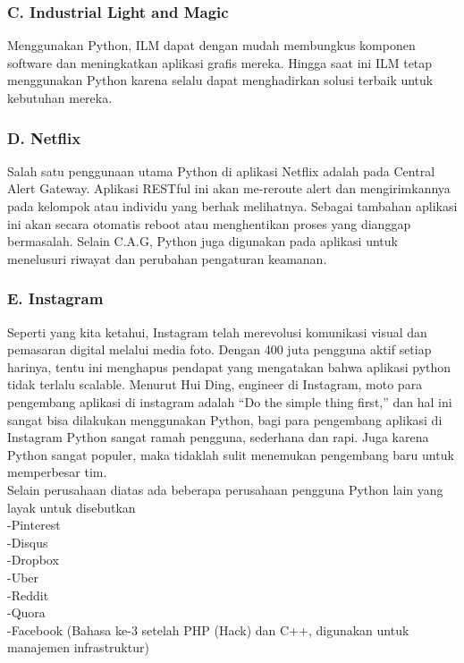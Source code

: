 \documentclass[12pt, times new roman, a4paper]{article}
\begin{document}
\subsubsection*{C. Industrial Light and Magic}
Menggunakan Python, ILM dapat dengan mudah membungkus komponen software dan meningkatkan aplikasi grafis mereka. Hingga saat ini ILM tetap menggunakan Python karena selalu dapat menghadirkan solusi terbaik untuk kebutuhan mereka.

\subsubsection*{D. Netflix}
Salah satu penggunaan utama Python di aplikasi Netflix adalah pada Central Alert Gateway. Aplikasi RESTful ini akan me-reroute alert dan mengirimkannya pada kelompok atau individu yang berhak melihatnya. Sebagai tambahan aplikasi ini akan secara otomatis reboot atau menghentikan proses yang dianggap bermasalah. Selain C.A.G, Python juga digunakan pada aplikasi untuk menelusuri riwayat dan perubahan pengaturan keamanan.

\subsubsection*{E. Instagram}
Seperti yang kita ketahui, Instagram telah merevolusi komunikasi visual dan pemasaran digital melalui media foto. Dengan 400 juta pengguna aktif setiap harinya, tentu ini menghapus pendapat yang mengatakan bahwa aplikasi python tidak terlalu scalable. Menurut Hui Ding, engineer di Instagram, moto para pengembang aplikasi di instagram adalah “Do the simple thing first,” dan hal ini sangat bisa dilakukan menggunakan Python, bagi para pengembang aplikasi di Instagram Python sangat ramah pengguna, sederhana dan rapi. Juga karena Python sangat populer, maka tidaklah sulit menemukan pengembang baru untuk memperbesar tim.\\
Selain perusahaan diatas ada beberapa perusahaan pengguna Python lain yang layak untuk disebutkan\\
-Pinterest\\
-Disqus\\
-Dropbox\\
-Uber\\
-Reddit\\
-Quora\\
-Facebook (Bahasa ke-3 setelah PHP (Hack) dan C++, digunakan untuk manajemen infrastruktur)\\
\end{document}
